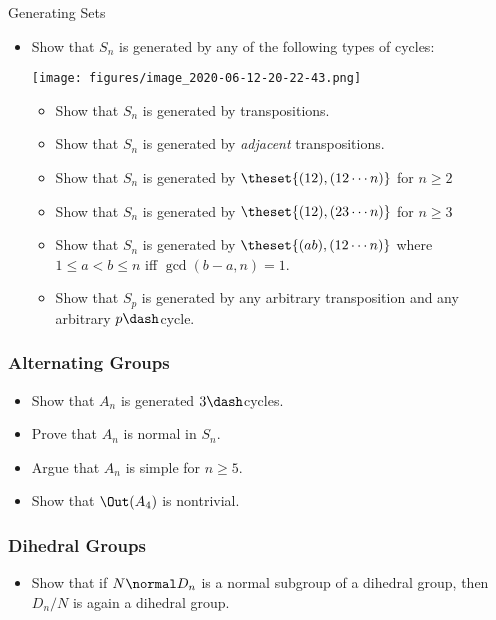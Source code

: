 Generating Sets

\begin{itemize}
\item
  Show that \(S_n\) is generated by any of the following types of
  cycles:

  \texttt{[image: figures/image\_2020-06-12-20-22-43.png]}

  \begin{itemize}
  \tightlist
  \item
    Show that \(S_n\) is generated by transpositions.
  \item
    Show that \(S_n\) is generated by \emph{adjacent} transpositions.
  \item
    Show that \(S_n\) is generated by \(\theset{(12), (12\cdots n)}\)
    for \(n\geq 2\)
  \item
    Show that \(S_n\) is generated by \(\theset{(12), (23\cdots n)}\)
    for \(n\geq 3\)
  \item
    Show that \(S_n\) is generated by \(\theset{(ab), (12\cdots n)}\)
    where \(1\leq a<b\leq n\) iff \(\gcd(b-a, n) = 1\).
  \item
    Show that \(S_p\) is generated by any arbitrary transposition and
    any arbitrary \(p\dash\)cycle.
  \end{itemize}
\end{itemize}

\hypertarget{alternating-groups}{%
\subsubsection{Alternating Groups}\label{alternating-groups}}

\begin{itemize}
\tightlist
\item
  Show that \(A_n\) is generated \(3\dash\)cycles.
\item
  Prove that \(A_n\) is normal in \(S_n\).
\item
  Argue that \(A_n\) is simple for \(n \geq 5\).
\item
  Show that \(\Out(A_4)\) is nontrivial.
\end{itemize}

\hypertarget{dihedral-groups}{%
\subsubsection{Dihedral Groups}\label{dihedral-groups}}

\begin{itemize}
\tightlist
\item
  Show that if \(N\normal D_n\) is a normal subgroup of a dihedral
  group, then \(D_n/N\) is again a dihedral group.
\end{itemize}

